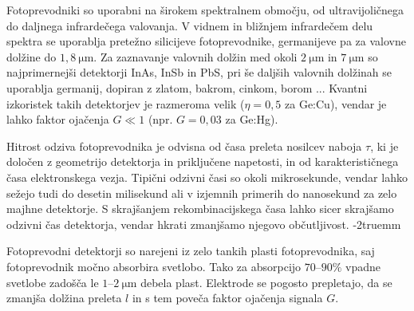%  

Fotoprevodniki so uporabni na širokem spektralnem območju, od ultra\-vijoličnega
do daljnega infra\-rdečega valovanja. 
V vidnem in bližnjem infrardečem delu spektra se 
uporablja pretežno silicijeve fotoprevodnike, germanijeve
pa za valovne dolžine do $1,8~\si{\micro\meter}$. Za zaznavanje valovnih dolžin med okoli 
$2~\si{\micro\meter}$ in $7~\si{\micro\meter}$ so najprimernejši detektorji 
InAs, InSb in PbS, 
pri še daljših valovnih dolžinah se uporablja germanij, dopiran z zlatom, bakrom, cinkom, borom ...
Kvantni izkoristek takih detektorjev je razmeroma velik ($\eta = 0,5$ za Ge:Cu), vendar
je lahko faktor ojačenja $G \ll 1$ (npr. $G = 0,03$ za Ge:Hg). 

Hitrost odziva fotoprevodnika je odvisna od časa preleta nosilcev naboja $\tau$,
ki je določen z geometrijo detektorja in priključene napetosti, 
in od karakterističnega časa elektronskega vezja. 
Tipični odzivni časi so okoli mikrosekunde, vendar lahko sežejo
tudi do desetin milisekund ali v izjemnih primerih do nanosekund za zelo majhne detektorje.
S skrajšanjem rekombinacijskega časa lahko sicer skrajšamo odzivni čas detektorja, 
vendar hkrati zmanjšamo njegovo občutljivost.
\vglue-2truemm
\begin{remark}
Fotoprevodni detektorji so narejeni iz zelo tankih plasti fotoprevodnika, saj fotoprevodnik močno absorbira
svetlobo. Tako za absorpcijo $70$--$90\%$ vpadne svetlobe zadošča le $1$--$2~\si{\micro\meter}$ debela plast.
Elektrode se pogosto prepletajo, da se zmanjša dolžina preleta $l$ in s tem poveča faktor ojačenja signala $G$. 
\end{remark}

